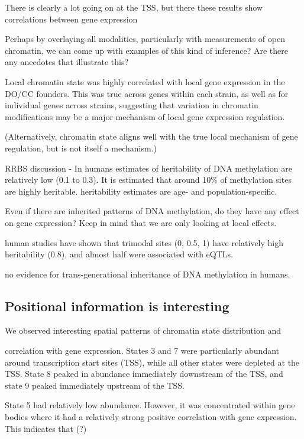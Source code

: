 \documentclass[10pt,letterpaper]{article}
\begin{document}
There is clearly a lot going on at the TSS, but there these results show
correlations between gene expression

Perhaps by overlaying all modalities, particularly with measurements of
open chromatin, we can come up with examples of this kind of inference?
Are there any anecdotes that illustrate this?

Local chromatin state was highly correlated with local gene expression
in the DO/CC founders. This was true across genes within each strain, as
well as for individual genes across strains, suggesting that variation
in chromatin modifications may be a major mechanism of local gene
expression regulation.

(Alternatively, chromatin state aligns well with the true local
mechanism of gene regulation, but is not itself a mechanism.)

RRBS discussion - In humans estimates of heritability of DNA methylation
are relatively low (0.1 to 0.3). It is estimated that around 10\% of
methylation sites are highly heritable. heritability estimates are age-
and population-specific.

Even if there are inherited patterns of DNA methylation, do they have
any effect on gene expression? Keep in mind that we are only looking at
local effects.

human studies have shown that trimodal sites (0, 0.5, 1) have relatively
high heritability (0.8), and almost half were associated with eQTLs.

no evidence for trans-generational inheritance of DNA methylation in
humans.

\hypertarget{positional-information-is-interesting}{%
\subsection{Positional information is
interesting}\label{positional-information-is-interesting}}

We observed interesting spatial patterns of chromatin state distribution
and

correlation with gene expression. States 3 and 7 were particularly
abundant around transcription start sites (TSS), while all other states
were depleted at the TSS. State 8 peaked in abundance immediately
downstream of the TSS, and state 9 peaked immediately upstream of the
TSS.

State 5 had relatively low abundance. However, it was concentrated
within gene bodies where it had a relatively strong positive correlation
with gene expression. This indicates that (?)
\end{document}
